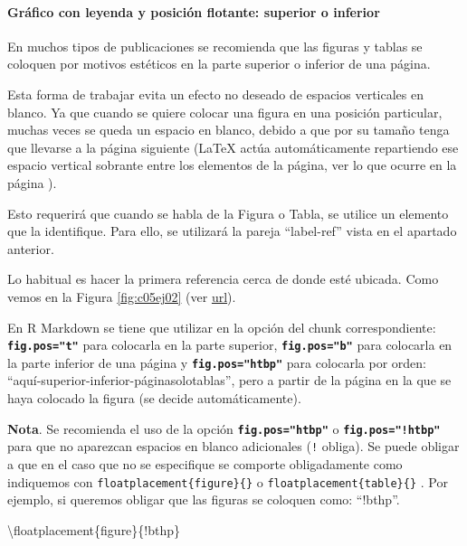 \documentclass[12pt,a4paper,oneside,]{article}
\newenvironment{Shaded}{\begin{snugshade}}{\end{snugshade}}
\newcommand{\FunctionTok}[1]{\textcolor[rgb]{0.00,0.00,0.00}{#1}}
\newcommand{\NormalTok}[1]{#1}
\let\oldparagraph\paragraph
\renewcommand{\paragraph}[1]{\oldparagraph{#1}\mbox{}}
\numberwithin{dummy}{section}
\theoremstyle{ocrenumbox}
\theoremstyle{blacknumex}
\theoremstyle{blacknumbox}
\theoremstyle{ocrenum}
\theoremstyle{ocrenum}
\begin{document}
\hypertarget{gruxe1fico-con-leyenda-y-posiciuxf3n-flotante-superior-o-inferior}{%
\paragraph{Gráfico con leyenda y posición flotante: superior o
inferior}\label{gruxe1fico-con-leyenda-y-posiciuxf3n-flotante-superior-o-inferior}}

En muchos tipos de publicaciones se recomienda que las figuras y tablas
se coloquen por motivos estéticos en la parte superior o inferior de una
página.

Esta forma de trabajar evita un efecto no deseado de espacios verticales
en blanco. Ya que cuando se quiere colocar una figura en una posición
particular, muchas veces se queda un espacio en blanco, debido a que por
su tamaño tenga que llevarse a la página siguiente (LaTeX actúa
automáticamente repartiendo ese espacio vertical sobrante entre los
elementos de la página, ver lo que ocurre en la página
\pageref{sec:incluirgrafico}).

Esto requerirá que cuando se habla de la Figura o Tabla, se utilice un
elemento que la identifique. Para ello, se utilizará la pareja
``label-ref'' vista en el apartado anterior.

Lo habitual es hacer la primera referencia cerca de donde esté ubicada.
Como vemos en la Figura \ref{fig:c05ej02} (ver
\href{https://resource-cms.springernature.com/springer-cms/rest/v1/content/19112/data/v5}{url}).

En R Markdown se tiene que utilizar en la opción del chunk
correspondiente: \textbf{\texttt{fig.pos="t"}} para colocarla en la
parte superior, \textbf{\texttt{fig.pos="b"}} para colocarla en la parte
inferior de una página y \textbf{\texttt{fig.pos="htbp"}} para colocarla
por orden: ``aquí-superior-inferior-páginasolotablas'', pero a partir de
la página en la que se haya colocado la figura (se decide
automáticamente).

\textbf{Nota}. Se recomienda el uso de la opción
\textbf{\texttt{fig.pos="htbp"}} o \textbf{\texttt{fig.pos="!htbp"}}
para que no aparezcan espacios en blanco adicionales (\texttt{!}
obliga). Se puede obligar a que en el caso que no se especifique se
comporte obligadamente como indiquemos con
\texttt{floatplacement\{figure\}\{\}} o
\texttt{floatplacement\{table\}\{\}} . Por ejemplo, si queremos obligar
que las figuras se coloquen como: ``!bthp''.

\begin{Shaded}
\begin{Highlighting}[]
\FunctionTok{\textbackslash{}floatplacement}\NormalTok{\{figure\}\{!bthp\}}
\end{Highlighting}
\end{Shaded}
\end{document}

